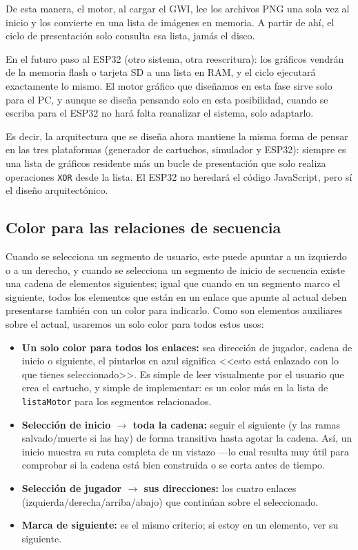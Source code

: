 De esta manera, el motor, al cargar el GWI, lee los archivos PNG una sola vez al inicio y los convierte en una lista de imágenes en memoria. A partir de ahí, el ciclo de presentación solo consulta esa lista, jamás el disco.

En el futuro paso al ESP32 (otro sistema, otra reescritura): los gráficos vendrán de la memoria flash o tarjeta SD a una lista en RAM, y el ciclo ejecutará exactamente lo mismo. El motor gráfico que diseñamos en esta fase sirve solo para el PC, y aunque se diseña pensando solo en esta posibilidad, cuando se escriba para el ESP32 no hará falta reanalizar el sistema, solo adaptarlo.

Es decir, la arquitectura que se diseña ahora mantiene la misma forma de pensar en las tres plataformas (generador de cartuchos, simulador y ESP32): siempre es una lista de gráficos residente más un bucle de presentación que solo realiza operaciones \texttt{XOR} desde la lista. El ESP32 no heredará el código JavaScript, pero sí el diseño arquitectónico.

\subsection{Color para las relaciones de secuencia}

Cuando se selecciona un segmento de usuario, este puede apuntar a un izquierdo o a un derecho, y cuando se selecciona un segmento de inicio de secuencia existe una cadena de elementos siguientes; igual que cuando en un segmento marco el siguiente, todos los elementos que están en un enlace que apunte al actual deben presentarse también con un color para indicarlo. Como son elementos auxiliares sobre el actual, usaremos un solo color para todos estos usos:

\begin{itemize}
	\item \textbf{Un solo color para todos los enlaces:} sea dirección de jugador, cadena de inicio o siguiente, el pintarlos en azul significa <<esto está enlazado con lo que tienes seleccionado>>. Es simple de leer visualmente por el usuario que crea el cartucho, y simple de implementar: es un color más en la lista de \texttt{listaMotor} para los segmentos relacionados.
	\item \textbf{Selección de inicio $\rightarrow$ toda la cadena:} seguir el siguiente (y las ramas salvado/muerte si las hay) de forma transitiva hasta agotar la cadena. Así, un inicio muestra su ruta completa de un vistazo ---lo cual resulta muy útil para comprobar si la cadena está bien construida o se corta antes de tiempo.
	\item \textbf{Selección de jugador $\rightarrow$ sus direcciones:} los cuatro enlaces (izquierda/derecha/arriba/abajo) que continúan sobre el seleccionado.
	\item \textbf{Marca de siguiente:} es el mismo criterio; si estoy en un elemento, ver su siguiente.
\end{itemize}


